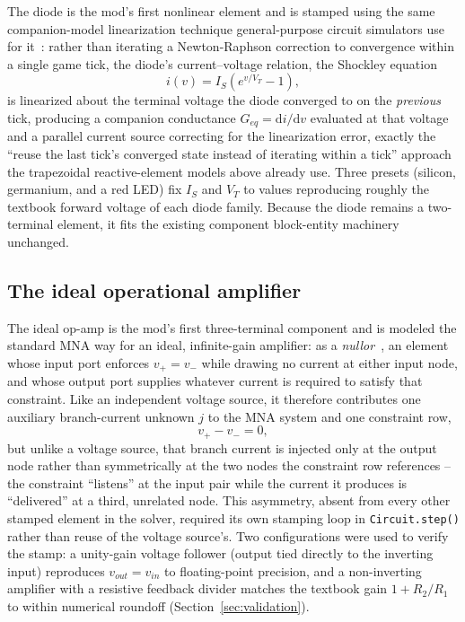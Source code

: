 The diode is the mod's first nonlinear element and is stamped using the same companion-model
linearization technique general-purpose circuit simulators use for
it~\cite{massobrio1993spice}: rather than iterating a Newton-Raphson correction to
convergence within a single game tick, the diode's current--voltage relation, the Shockley
equation~\cite{shockley1949diode}
\begin{equation}
i(v) = I_S\left(e^{v/V_T} - 1\right),
\end{equation}
is linearized about the terminal voltage the diode converged to on the \emph{previous} tick,
producing a companion conductance $G_{eq} = \mathrm{d}i/\mathrm{d}v$ evaluated at that
voltage and a parallel current source correcting for the linearization error, exactly the
``reuse the last tick's converged state instead of iterating within a tick'' approach the
trapezoidal reactive-element models above already use. Three presets (silicon, germanium,
and a red LED) fix $I_S$ and $V_T$ to values reproducing roughly the textbook forward voltage
of each diode family. Because the diode remains a two-terminal element, it fits the existing
component block-entity machinery unchanged.

\subsection{The ideal operational amplifier}

The ideal op-amp is the mod's first three-terminal component and is modeled the standard MNA
way for an ideal, infinite-gain amplifier: as a \emph{nullor}~\cite{chualin1975nullor}, an
element whose input port enforces $v_{+} = v_{-}$ while drawing no current at either input
node, and whose output port supplies whatever current is required to satisfy that
constraint. Like an independent voltage source, it therefore contributes one auxiliary
branch-current unknown $j$ to the MNA system and one constraint row,
\begin{equation}
v_{+} - v_{-} = 0,
\end{equation}
but unlike a voltage source, that branch current is injected only at the output node rather
than symmetrically at the two nodes the constraint row references -- the constraint
``listens'' at the input pair while the current it produces is ``delivered'' at a third,
unrelated node. This asymmetry, absent from every other stamped element in the solver,
required its own stamping loop in \texttt{Circuit.step()} rather than reuse of the voltage
source's. Two configurations were used to verify the stamp: a unity-gain voltage follower
(output tied directly to the inverting input) reproduces $v_{out} = v_{in}$ to
floating-point precision, and a non-inverting amplifier with a resistive feedback divider
matches the textbook gain $1 + R_2/R_1$ to within numerical roundoff
(Section~\ref{sec:validation}).

